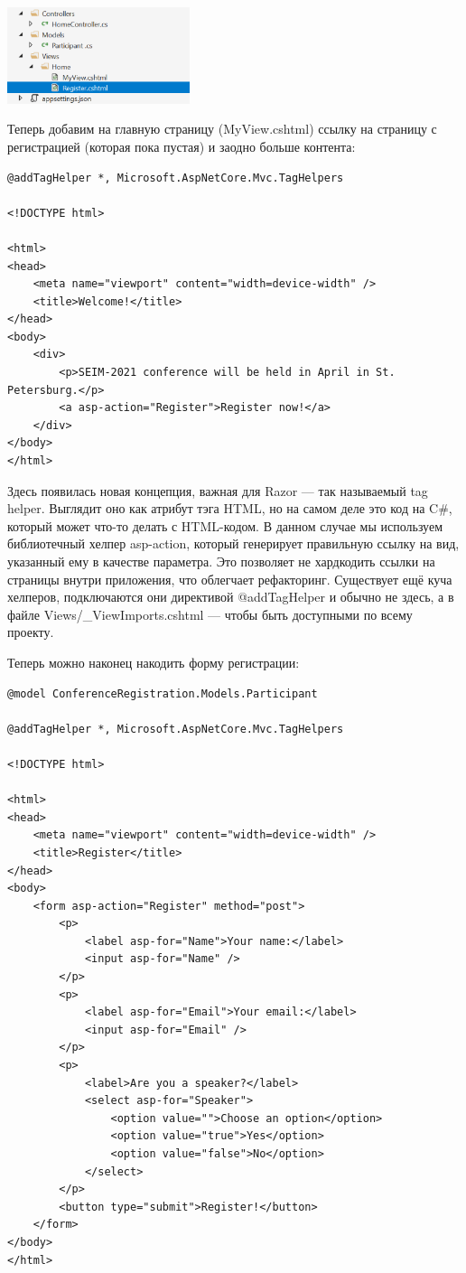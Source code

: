 \documentclass[a5paper]{article}
\begin{document}
\begin{center}
    \includegraphics[width=0.4\textwidth]{secondView.png}
\end{center}

Теперь добавим на главную страницу (MyView.cshtml) ссылку на страницу с регистрацией (которая пока пустая) и заодно больше контента:

\begin{verbatim}
@addTagHelper *, Microsoft.AspNetCore.Mvc.TagHelpers

<!DOCTYPE html>

<html>
<head>
    <meta name="viewport" content="width=device-width" />
    <title>Welcome!</title>
</head>
<body>
    <div>
        <p>SEIM-2021 conference will be held in April in St. Petersburg.</p>
        <a asp-action="Register">Register now!</a>
    </div>
</body>
</html>
\end{verbatim}

Здесь появилась новая концепция, важная для Razor --- так называемый tag helper. Выглядит оно как атрибут тэга HTML, но на самом деле это код на C\#, который может что-то делать с HTML-кодом. В данном случае мы используем библиотечный хелпер asp-action, который
генерирует правильную ссылку на вид, указанный ему в качестве параметра. Это позволяет не хардкодить ссылки на страницы внутри приложения, что облегчает рефакторинг. Существует ещё куча хелперов, подключаются они директивой @addTagHelper и обычно не здесь, а в файле
Views/\_ViewImports.cshtml --- чтобы быть доступными по всему проекту.

Теперь можно наконец накодить форму регистрации:

\begin{verbatim}
@model ConferenceRegistration.Models.Participant

@addTagHelper *, Microsoft.AspNetCore.Mvc.TagHelpers

<!DOCTYPE html>

<html>
<head>
    <meta name="viewport" content="width=device-width" />
    <title>Register</title>
</head>
<body>
    <form asp-action="Register" method="post">
        <p>
            <label asp-for="Name">Your name:</label>
            <input asp-for="Name" />
        </p>
        <p>
            <label asp-for="Email">Your email:</label>
            <input asp-for="Email" />
        </p>
        <p>
            <label>Are you a speaker?</label>
            <select asp-for="Speaker">
                <option value="">Choose an option</option>
                <option value="true">Yes</option>
                <option value="false">No</option>
            </select>
        </p>
        <button type="submit">Register!</button>
    </form>
</body>
</html>
\end{verbatim}
\end{document}
